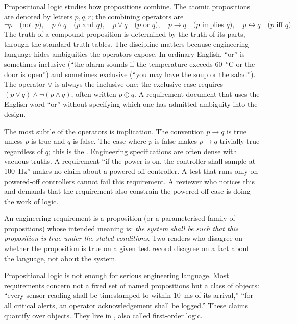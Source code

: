 Propositional logic studies how propositions combine. The atomic propositions are denoted by letters $p, q, r$; the combining operators are
\[
\lnot p \quad \text{(not $p$)}, \quad
p \wedge q \quad \text{($p$ and $q$)}, \quad
p \vee q \quad \text{($p$ or $q$)}, \quad
p \to q \quad \text{($p$ implies $q$)}, \quad
p \leftrightarrow q \quad \text{($p$ iff $q$)}.
\]
The truth of a compound proposition is determined by the truth of its parts, through the standard truth tables. The discipline matters because engineering language hides ambiguities the operators expose. In ordinary English, ``or'' is sometimes inclusive (``the alarm sounds if the temperature exceeds \SI{60}{\degreeCelsius} or the door is open'') and sometimes exclusive (``you may have the soup or the salad''). The operator $\vee$ is always the inclusive one; the exclusive case requires $(p \vee q) \wedge \lnot(p \wedge q)$, often written $p \oplus q$. A requirement document that uses the English word ``or'' without specifying which one has admitted ambiguity into the design.

The most subtle of the operators is implication. The convention $p \to q$ is true unless $p$ is true and $q$ is false. The case where $p$ is false makes $p \to q$ trivially true regardless of $q$; this is the . Engineering specifications are often dense with vacuous truths. A requirement ``if the power is on, the controller shall sample at \SI{100}{\hertz}'' makes no claim about a powered-off controller. A test that runs only on powered-off controllers cannot fail this requirement. A reviewer who notices this and demands that the requirement also constrain the powered-off case is doing the work of logic.

\begin{principle}
An engineering requirement is a proposition (or a parameterised family of propositions) whose intended meaning is: \emph{the system shall be such that this proposition is true under the stated conditions}. Two readers who disagree on whether the proposition is true on a given test record disagree on a fact about the language, not about the system.
\end{principle}

Propositional logic is not enough for serious engineering language. Most requirements concern not a fixed set of named propositions but a class of objects: ``every sensor reading shall be timestamped to within \SI{10}{\milli\second} of its arrival,'' ``for all critical alerts, an operator acknowledgement shall be logged.'' These claims quantify over objects. They live in , also called first-order logic.

